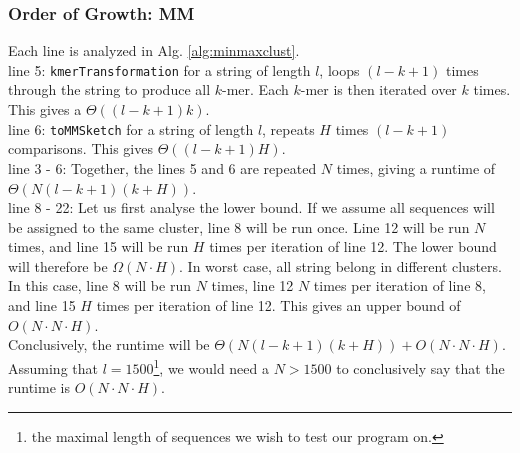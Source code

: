 \documentclass[../../main.tex]{subfiles}
\begin{document}
\subsubsection{Order of Growth: MM}
Each line is analyzed in Alg. \ref{alg:minmaxclust}.\\
line 5: \texttt{kmerTransformation} for a string of length $l$, loops $(l - k + 1)$ times through the string to produce all $k$-mer. Each $k$-mer is then iterated over $k$ times. This gives a $\Theta((l-k+1)k)$.\\
line 6: \texttt{toMMSketch} for a string of length $l$, repeats $H$ times $(l-k+1)$ comparisons. This gives $\Theta((l-k+1)H)$.\\
line 3 - 6: Together, the lines 5 and 6 are repeated $N$ times, giving a runtime of $\Theta(N (l-k+1)(k + H))$.\\
line 8 - 22: Let us first analyse the lower bound. If we assume all sequences will be assigned to the same cluster, line 8 will be run once. Line 12 will be run $N$ times, and line 15 will be run $H$ times per iteration of line 12. The lower bound will therefore be $\Omega(N\cdot H)$. In worst case, all string belong in different clusters. In this case, line 8 will be run $N$ times, line 12 $N$ times per iteration of line 8, and line 15 $H$ times per iteration of line 12. This gives an upper bound of $O(N\cdot N\cdot H)$.\\

Conclusively, the runtime will be $\Theta(N (l-k+1)(k + H)) + O(N\cdot N\cdot H)$. Assuming that $l=1500$\footnote{the maximal length of sequences we wish to test our program on.}, we would need a $N>1500$ to conclusively say that the runtime is $O(N\cdot N\cdot H)$.
\end{document}
